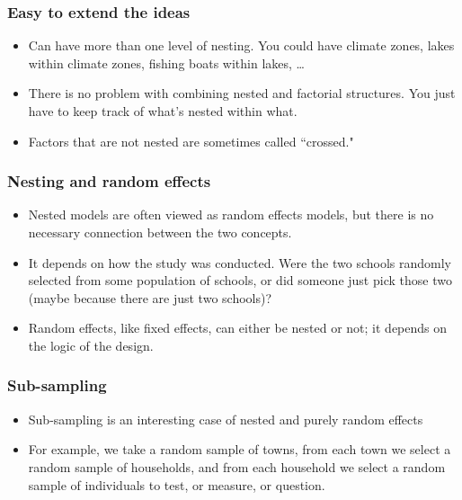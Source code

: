 \documentclass[serif]{beamer} %
\begin{document}
\begin{frame}
\frametitle{Easy to extend the ideas}
  \begin{itemize}
    \item Can have more than one level of nesting.  You could have climate zones, 		lakes within climate zones, fishing boats within lakes, \ldots
    \item There is no problem with combining nested and factorial structures.  You just have to keep track of what's nested within what.  
    \item Factors that are not nested are sometimes called ``crossed."  
  \end{itemize}
\end{frame}

\begin{frame}
\frametitle{Nesting and random effects}
  \begin{itemize}
    \item Nested models are often viewed as random effects models, but there is no necessary connection between the two concepts.
    \item It depends on how the study was conducted. Were the two schools randomly selected from some population of schools, or did someone just pick those two (maybe because there are just two schools)? 
    \item Random effects, like fixed effects, can either be nested or not; it depends on the logic of the design.
  \end{itemize}
\end{frame}

\begin{frame}
\frametitle{Sub-sampling}
  \begin{itemize}
    \item Sub-sampling is an interesting case of nested and purely random effects
    \item For example, we take a random sample of towns, from each town we select a random sample of households, and from each household we select a random sample of individuals to test, or measure, or question.
  \end{itemize}
\end{frame}
\end{document}
